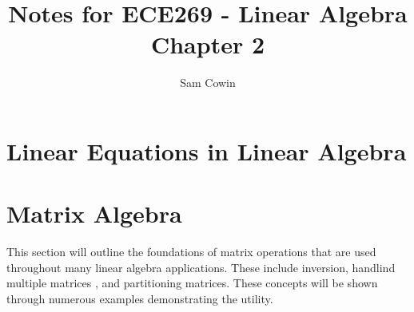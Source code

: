 \documentclass[12pt]{article}
\begin{document}
\setlength{\abovedisplayskip}{0pt}
\setlength{\belowdisplayskip}{0pt}
\setlength{\abovedisplayshortskip}{0pt}
\setlength{\belowdisplayshortskip}{0pt}
    
\title{Notes for ECE269 - Linear Algebra \\
\large Chapter 2}
\author{Sam Cowin}
\maketitle

\section{Linear Equations in Linear Algebra}
\section{Matrix Algebra}
This section will outline the foundations of matrix operations that are used throughout many linear algebra applications. These include inversion, handlind multiple matrices %
, and partitioning matrices. These concepts will be shown through numerous examples demonstrating the utility.
\end{document}
